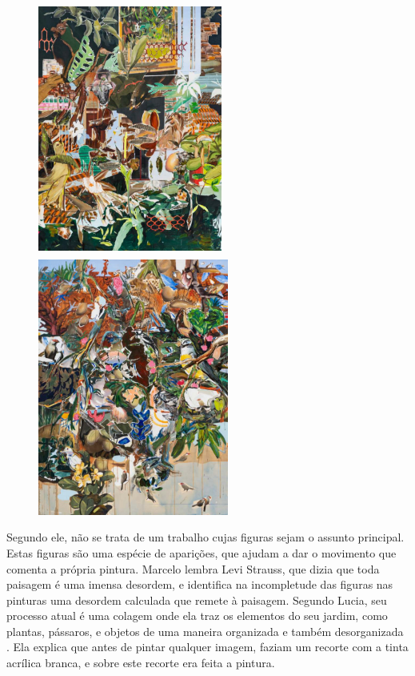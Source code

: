 \begin{figure}
	\begin{minipage}{.45\linewidth}
		\caption{}
		\includegraphics[width=2.38516in,height=3.3184in]{figuras/laguna-jardim53-2021.pdf.compressed.pdf}
	\end{minipage}\hfill
	\begin{minipage}{.45\linewidth}
		\caption{}
		\includegraphics[height=3.3184in]{figuras/laguna-jardim55-2021.pdf.compressed.pdf}
	\end{minipage}
\end{figure}

Segundo ele, não se trata de um trabalho cujas figuras sejam o assunto
principal. Estas figuras são uma espécie de aparições, que ajudam a dar
o movimento que comenta a própria pintura. Marcelo lembra Levi Strauss,
que dizia que toda paisagem é uma imensa desordem, e identifica na
incompletude das figuras nas pinturas uma desordem calculada que remete
à paisagem. Segundo Lucia, seu processo atual é uma colagem onde ela
traz os elementos do seu jardim, como plantas, pássaros, e objetos de
uma maneira organizada e também desorganizada \parencite{gabriel2022laguna}.
Ela explica que antes de pintar qualquer imagem, faziam um recorte com
a tinta acrílica branca, e sobre este recorte era feita a pintura.



